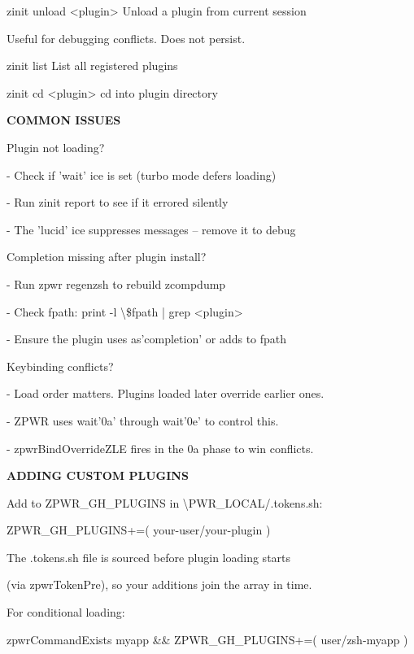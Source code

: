 \documentclass[11pt,a4paper,twoside]{book}
\begin{document}
zinit unload <plugin>      Unload a plugin from current session

Useful for debugging conflicts. Does not persist.

zinit list                List all registered plugins

zinit cd <plugin>          cd into plugin directory


\vspace{12pt}
{\bfseries\color{neonyellow} COMMON ISSUES}\vspace{4pt}

Plugin not loading?

- Check if 'wait' ice is set (turbo mode defers loading)

- Run zinit report to see if it errored silently

- The 'lucid' ice suppresses messages -- remove it to debug

Completion missing after plugin install?

\begin{codebox}
- Run zpwr regenzsh to rebuild zcompdump\\
\end{codebox}

- Check fpath: print -l \textbackslash{}\$fpath | grep <plugin>

- Ensure the plugin uses as'completion' or adds to fpath

Keybinding conflicts?

- Load order matters. Plugins loaded later override earlier ones.

- ZPWR uses wait'0a' through wait'0e' to control this.

- zpwrBindOverrideZLE fires in the 0a phase to win conflicts.


\vspace{12pt}
{\bfseries\color{neonyellow} ADDING CUSTOM PLUGINS}\vspace{4pt}

Add to ZPWR\_GH\_PLUGINS in \textbackslash{}PWR\_LOCAL/.tokens.sh:

ZPWR\_GH\_PLUGINS+=( your-user/your-plugin )

The .tokens.sh file is sourced before plugin loading starts

(via zpwrTokenPre), so your additions join the array in time.

For conditional loading:

\begin{codebox}
zpwrCommandExists myapp \&\& ZPWR\_GH\_PLUGINS+=( user/zsh-myapp )\\
\end{codebox}
\end{document}
